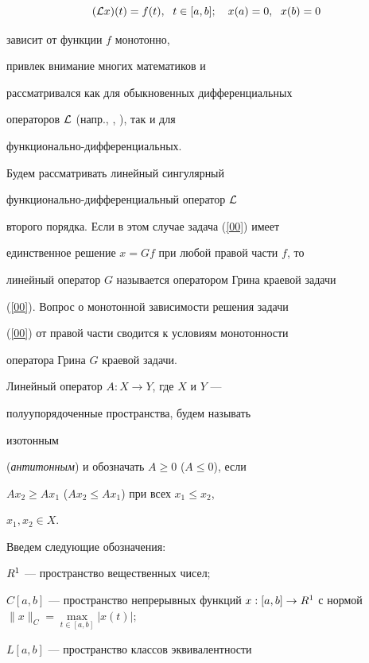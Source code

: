 \begin{equation}


\label{00}


({\cal L} x)(t)=f(t),\ \; t\in[a,b];\quad x(a)=0,\ \; x(b)=0


\end{equation}


зависит от функции $f$ монотонно,


привлек внимание многих математиков и


рассматривался как для обыкновенных дифференциальных


операторов ${\cal L}$ (напр., \cite{Lev}, \cite{KSh}), так и для


функционально-дифференциальных.


Будем рассматривать линейный сингулярный


функционально-диф\-фе\-рен\-ци\-аль\-ный оператор ${\cal L}$


второго порядка. Если в этом случае задача (\ref{00}) имеет


единственное решение $x=Gf$ при любой правой части $f$, то


линейный оператор $G$ называется оператором Грина краевой задачи


(\ref{00}). Вопрос о монотонной зависимости решения задачи


(\ref{00}) от правой части сводится к условиям монотонности


оператора Грина $G$ краевой задачи.





Линейный оператор $A:X\to Y$, где $X$ и $Y$ ---


полуупорядоченные пространства, будем называть {\it


изотонным} ({\it антитонным}) и обозначать $A\ge0$ ($A\le0$), если


$Ax_2\ge Ax_1$ ($Ax_2\le Ax_1$) при всех $x_1\le x_2$,


$x_1,x_2\in X$.





Введем следующие обозначения:


${R}^1$ --- пространство вещественных чисел;


$C[a,b]$ --- пространство непрерывных функций $x:[a,b]\to


\R$ с нормой $\|x\|_C=\max\limits_{t\in[a,b]}|x(t)|;$


$L[a,b]$ --- пространство классов эквивалентности


